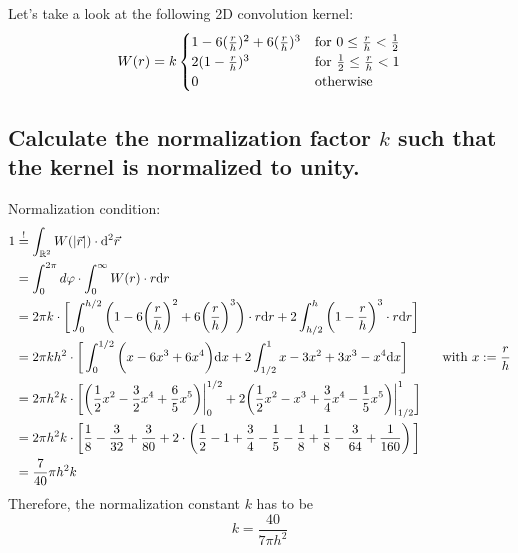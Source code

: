 Let's take a look at the following 2D convolution kernel:
\begin{equation}
    W(r)=k\begin{cases}
        1-6(\frac{r}{h})^2+6(\frac{r}{h})^3 
        & \textnormal{for }0\leq\frac{r}{h}<\frac{1}{2} \\
        2(1-\frac{r}{h})^3
        & \textnormal{for }\frac{1}{2}\leq\frac{r}{h}<1 \\
        0 
        & \textnormal{otherwise} \\
    \end{cases}
\end{equation}

\subsection{Calculate the normalization factor $k$ such that the 
kernel is normalized to unity.}
    Normalization condition:
    \begin{align}
        1
        &\overset{!}{=}\int_{\mathbb{R}^2}W(|\vec r|)\cdot\mathrm{d}^2\vec r \\
        &=\int_0^{2\pi}d\varphi\cdot\int_0^\infty W(r)\cdot r \mathrm{d} r \\
        &=2\pi k\cdot\bigg[
            \int_0^{h/2}\bigg(
                1-6\bigg(\frac{r}{h}\bigg)^2+
                6\bigg(\frac{r}{h}\bigg)^3
            \bigg)\cdot r \mathrm{d} r+2\int_{h/2}^h\bigg(1-\frac{r}{h}\bigg)^3\cdot r \mathrm{d} r
        \bigg] \\
        &=2\pi kh^2\cdot\bigg[
            \int_0^{1/2}\bigg(
                x-6x^3+
                6x^4
            \bigg) \mathrm{d} x+2\int_{1/2}^1 x - 3x^2 + 3x^3 - x^4 \mathrm{d} x
        \bigg] \ \ \ \ \ \ \ \ \textnormal{with $x:=\frac{r}{h}$} \\
        &=2\pi h^2k\cdot\bigg[
            \bigg(
                \frac{1}{2}x^2-\frac{3}{2}x^4 + \frac{6}{5}x^5 
            \bigg)\bigg|_0^{1/2}+2\bigg(
                \frac{1}{2}x^2 - x^3 + \frac{3}{4}x^4 - \frac{1}{5}x^5
            \bigg)\bigg|_{1/2}^{1}
        \bigg] \\
        &=2\pi h^2k\cdot\bigg[
            \frac{1}{8} - \frac{3}{32} + \frac{3}{80} + 2 \cdot \left(\frac{1}{2}- 1 + \frac{3}{4} -\frac{1}{5} - \frac{1}{8} + \frac{1}{8} -\frac{3}{64} + \frac{1}{160}\right)  
        \bigg] \\
        &=\frac{7}{40}\pi h^2k
    \end{align}
    Therefore, the normalization constant $k$ has to be
    \begin{equation}
        k=\frac{40}{7\pi h^2}
    \end{equation}

